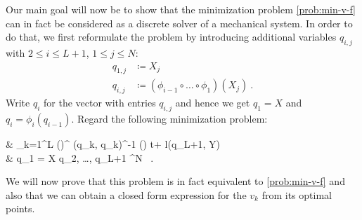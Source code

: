 Our main goal will now be to show that the minimization problem \ref{prob:min-v-f} can in fact be considered as a discrete solver of a mechanical system.
In order to do that, we first reformulate the problem by introducing additional variables $q_{i,j}$ with $2 \leq i \leq L+1$, $1 \leq j \leq N$:
\begin{align}
	q_{1, j} &\coloneqq X_j \, \\
	q_{i, j} &\coloneqq (\phi_{i-1} \circ \ldots \circ \phi_1) (X_j) \ .
\end{align}
Write $q_i$ for the vector with entries $q_{i,j}$ and hence we get $q_1 = X$ and $q_i = \phi_i(q_{i-1})$.
Regard the following minimization problem:
\begin{problem}
	\label{prob:min-q}
	\begin{cases}
		 & \nu \cdot {} \sum_{k=1}^{L} \left(\right)^ \bGamma(q_k, q_k)^{-1} \left(\right) \Delta t+ l(q_{L+1}, Y) \\
		 & q_1 = X  q_2, \ldots, q_{L+1} \in \cX^N \ .
	\end{cases}
\end{problem}
We will now prove that this problem is in fact equivalent to \cref{prob:min-v-f} and also that we can obtain a closed form expression for the $v_k$ from its optimal points.

